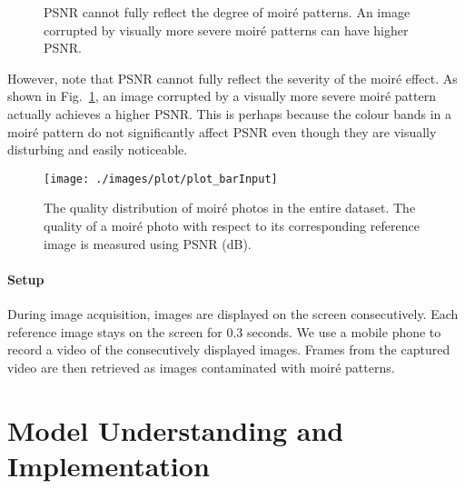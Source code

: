 \documentclass[journal]{IEEEtran}
\begin{document}
\begin{figure}[t]
\begin{center}
\hspace{-.8em}
\hspace{-.8em}
\hspace{-.8em}
\end{center}
\caption{PSNR cannot fully reflect the degree of moir\'{e} patterns. An image corrupted by visually more severe moir\'{e} patterns can have higher PSNR.}
\label{fig:PSNRdemo}
\end{figure}

However, note that PSNR cannot fully reflect the severity of the moir\'{e} effect. As shown in Fig.~\ref{fig:PSNRdemo}, an image corrupted by a visually more severe moir\'{e} pattern actually achieves a higher PSNR. This is perhaps because the colour bands in a moir\'{e} pattern do not significantly affect PSNR even though they are visually disturbing and easily noticeable.


\begin{figure}[t]
\begin{center}
 \texttt{[image: ./images/plot/plot\_barInput]}
\end{center}
 \caption{The quality distribution of moir\'{e} photos in the entire dataset. The quality of a moir\'{e} photo with respect to its corresponding reference image is measured using PSNR (dB).}
\label{fig:barInput}
\end{figure}




\paragraph{Setup}
During image acquisition, images are displayed on the screen consecutively. Each reference image stays on the screen for 0.3 seconds. We use a mobile phone to record a video of the consecutively displayed images. Frames from the captured video are then retrieved as images contaminated with moir\'{e} patterns.


\section{Model Understanding and Implementation}
\end{document}
